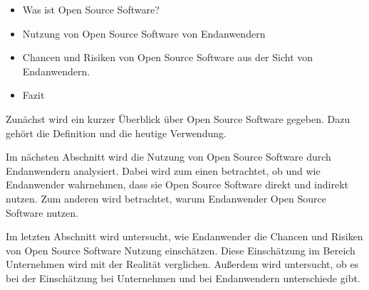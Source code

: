 \documentclass[a4paper]{article}
\begin{document}
	   \begin{itemize}
	       \item Was ist Open Source Software?
	       \item Nutzung von Open Source Software von Endanwendern
	       \item Chancen und Risiken von Open Source Software aus der Sicht von Endanwendern.
	       \item Fazit
	   \end{itemize}
	   
	   Zunächst wird ein kurzer Überblick über Open Source Software gegeben. Dazu gehört die Definition und die heutige Verwendung.
	   
	   
	   Im nächsten Abschnitt wird die Nutzung von Open Source Software durch Endanwendern analysiert. Dabei wird zum einen betrachtet, ob und wie Endanwender wahrnehmen, dass sie Open Source Software direkt und indirekt nutzen.
	   Zum anderen wird betrachtet, warum Endanwender Open Source Software nutzen.
	   
	   Im letzten Abschnitt wird untersucht, wie Endanwender die Chancen und Risiken von Open Source Software Nutzung einschätzen.
	   Diese Einschätzung im Bereich Unternehmen wird mit der Realität verglichen.
	   Außerdem wird untersucht, ob es bei der Einschätzung bei Unternehmen und bei Endanwendern unterschiede gibt. %
	
        
    \clearpage
    \nocite{*}
    \printbibliography
\end{document}
